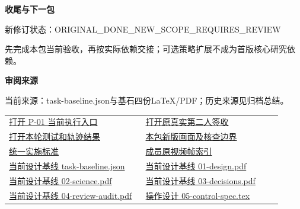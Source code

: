 \documentclass[11pt,a4paper]{article}
\newcommand{\reviewsubsection}[1]{\par\Needspace{4\baselineskip}\vspace{4pt}\begin{center}{\titlelatin\titlecjk\bfseries\fontsize{12}{18}\selectfont #1}\end{center}}
\begin{document}
\reviewsubsection{3.3 收尾与下一包}
新修订状态：ORIGINAL\_\allowbreak{}DONE\_\allowbreak{}NEW\_\allowbreak{}SCOPE\_\allowbreak{}REQUIRES\_\allowbreak{}REVIEW


先完成本包当前验收，再按实际依赖交接；可选策略扩展不成为首版核心研究依赖。


\begin{minipage}{\linewidth}
\reviewsubsection{3.4 审阅来源}
当前来源：task-\allowbreak{}baseline.json与基石四份LaTeX/\allowbreak{}PDF；历史来源见归档总结。


\begingroup\small\setlength{\tabcolsep}{4pt}\begin{tabular}{@{}p{0.48\linewidth}p{0.48\linewidth}@{}}
\href{file:///D:/Agent/srp/agent/tasks/P-01/execution/verify.py}{打开 P-\allowbreak{}01 当前执行入口} & \href{file:///D:/Agent/srp/agent/modules/srp_session_core/P-01_\%E7\%AC\%AC\%E4\%BA\%8C\%E4\%BA\%BA\%E5\%AE\%A1\%E6\%A0\%B8\%E6\%8A\%A5\%E5\%91\%8A_\%E5\%B7\%B2\%E7\%AD\%BE\%E7\%BD\%B2.md}{打开原真实第二人签收}\\[4pt]
\href{file:///D:/Agent/srp/agent/tasks/P-01/evidence/verification.json}{打开本轮测试和轨迹结果} & \href{file:///D:/Agent/srp/agent/tasks/P-01/outputs/current-implementation-evidence.md}{本包新版画面及核查边界}\\[4pt]
\href{file:///D:/Agent/srp/agent/design/weather/2026-10-08_Storm\%E4\%B8\%8E\%E7\%BA\%AF\%E7\%B2\%92\%E5\%AD\%90\%E5\%8F\%8C\%E7\%8E\%AF\%E5\%AE\%9E\%E6\%96\%BD\%E6\%A0\%87\%E5\%87\%86.md}{统一实施标准} & \href{file:///D:/Agent/srp/human/assets/previews/2026-10-08/member-storm-particle-rings/frame-index.json}{成员原视频帧索引}\\[4pt]
\href{file:///D:/Agent/srp/agent/design/design-foundation-20261008/task-baseline.json}{当前设计基线 task-\allowbreak{}baseline.json} & \href{file:///D:/Agent/srp/agent/design/design-foundation-20261008/01-design.pdf}{当前设计基线 01-\allowbreak{}design.pdf}\\[4pt]
\href{file:///D:/Agent/srp/agent/design/design-foundation-20261008/02-science.pdf}{当前设计基线 02-\allowbreak{}science.pdf} & \href{file:///D:/Agent/srp/agent/design/design-foundation-20261008/03-decisions.pdf}{当前设计基线 03-\allowbreak{}decisions.pdf}\\[4pt]
\href{file:///D:/Agent/srp/agent/design/design-foundation-20261008/04-review-audit.pdf}{当前设计基线 04-\allowbreak{}review-\allowbreak{}audit.pdf} & \href{file:///D:/Agent/srp/agent/design/design-foundation-20261008/05-control-spec.tex}{操作设计 05-\allowbreak{}control-\allowbreak{}spec.tex}\\[4pt]

\end{tabular}
\end{minipage}
\end{document}

